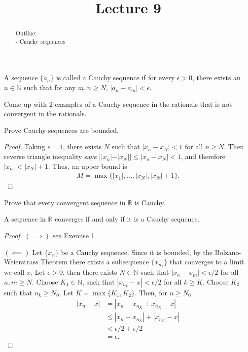 \documentclass{ximera}
\begin{document}
    \title{Lecture 9}
    
    \begin{abstract}  
    Outline: \\
    - Cauchy sequences
\end{abstract}

\maketitle

\begin{definition}
    A sequence $\{a_n\}$ is called a Cauchy sequence if for every $\epsilon > 0$, there exists an $n \in \mathbb{N}$ such that for any $m,n\geq N$, $|a_n-a_m|< \epsilon$.
\end{definition}

\begin{exercise}
    Come up with 2 examples of a Cauchy sequence in the rationals that is not convergent in the rationals.
\end{exercise}

\begin{exercise}
    Prove Cauchy sequences are bounded.
\end{exercise}
\begin{proof}
    Taking $\epsilon = 1$, there exists $N$ such that $|x_n - x_N| < 1$ for all $n \geq N$.  Then reverse triangle inequality says $||x_n| - |x_N|| \leq |x_n - x_N| < 1$, and therefore $|x_n| < |x_N| + 1$.  Thus, an upper bound is
    \begin{align}
        M = \max\{|x_1|, ..., |x_N|, |x_N|+1\}.
    \end{align}
\end{proof}

\begin{exercise}
    Prove that every convergent sequence in $\mathbb{R}$ is Cauchy.
\end{exercise}

\begin{theorem}
    A sequence in $\mathbb{R}$ converges if and only if it is a Cauchy sequence.
\end{theorem}
\begin{proof}
    $(\implies)$ see Exercise 1

    $(\impliedby)$  Let $\{x_n\}$ be a Cauchy sequence.  Since it is bounded, by the Bolzano-Weierstrass Theorem there exists a subsequence $\{x_{n_k}\}$ that converges to a limit we call $x$.  Let $\epsilon > 0$, then there exists $N \in \mathbb{N}$ such that $|x_n-x_m| < \epsilon/2$ for all $n,m \geq N$.  Choose $K_1 \in \mathbb{N}$, such that $|x_{n_k} - x| < \epsilon/2$ for all $k \geq K$.  Choose $K_2$ such that $n_k \geq N_0$.  Let $K = \max\{K_1,K_2\}$.  Then, for $n \geq N_0$
    \begin{align}
        |x_n -x| &= |x_n - x_{n_K} + x_{n_K}-x|
        \\
        &\leq |x_n - x_{n_K}| + |x_{n_K}-x|
        \\
        &< \epsilon/2 + \epsilon/2 \\
        &= \epsilon.
    \end{align}
\end{proof}
\end{document}
